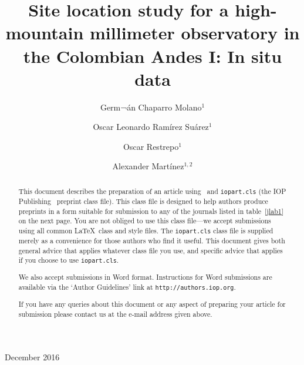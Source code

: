 \documentclass[12pt]{iopart}
\begin{document}
\title[Site Location Study for a Millimeter Observatory in the Colombian Andes I: In Situ]{Site location study for a high-mountain millimeter observatory in the Colombian Andes I: In situ data}


\author{Germ¬\'an Chaparro Molano$^{1}$}
\address{$^1$Grupo de Simulaci\'on, An\'alisis y Modelado, Vicerrector\'ia de Investigaci\'on, Universidad ECCI, Bogot\'a, Colombia}
\author{Oscar Leonardo Ram\'irez Su\'arez$^{1}$}
\address{$^1$Grupo de Simulaci\'on, An\'alisis y Modelado, Vicerrector\'ia de Investigaci\'on, Universidad ECCI, Bogot\'a, Colombia}
\author{Oscar Restrepo$^{1}$}
\address{$^1$Grupo de Simulaci\'on, An\'alisis y Modelado, Vicerrector\'ia de Investigaci\'on, Universidad ECCI, Bogot\'a, Colombia}
\author{Alexander Mart\'inez$^{1,2}$}
\address{$^1$Grupo de Simulaci\'on, An\'alisis y Modelado, Vicerrector\'ia de Investigaci\'on, Universidad ECCI, Bogot\'a, Colombia}
\address{$^2$Instituto de Hidrolog\'ia, Meteorolog\'ia y Estudios Ambientales, Bogot\'a, Colombia}
\vspace{10pt}
\begin{indented}
\item[]December 2016
\end{indented}

\begin{abstract}
This document describes the  preparation of an article using \LaTeXe\ and 
\verb"iopart.cls" (the IOP Publishing \LaTeXe\ preprint class file).
This class file is designed to help 
authors produce preprints in a form suitable for submission to any of the
journals listed in table~\ref{jlab1} on the next page.  You are not obliged to use this class file---we accept
submissions using all common \LaTeX\ class and style files.  The \verb"iopart.cls"
class file is supplied merely as a convenience for those authors who find it useful.
This document gives both general advice that applies whatever class file you use, and specific advice
that applies if you choose to use \verb"iopart.cls".

We also accept submissions in Word format.  Instructions for Word submissions are available via the `Author Guidelines' link at \verb"http://authors.iop.org".

If you have any queries about this document or any aspect of preparing your article for submission please contact us at the e-mail address given above.
\end{abstract}
\end{document}
